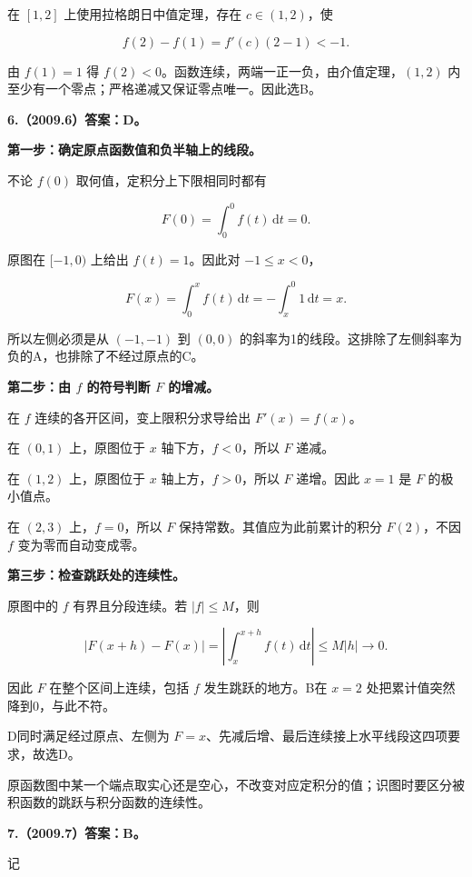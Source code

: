 \documentclass[UTF8,11pt,fontset=windows]{ctexart}
\begin{document}
在 $[1,2]$ 上使用拉格朗日中值定理，存在 $c\in(1,2)$，使

$$
f(2)-f(1)=f'(c)(2-1)<-1.
$$

由 $f(1)=1$ 得 $f(2)<0$。函数连续，两端一正一负，由介值定理，$(1,2)$ 内至少有一个零点；严格递减又保证零点唯一。因此选B。

\clearpage

\textbf{6.（2009.6）答案：D。}

\textbf{第一步：确定原点函数值和负半轴上的线段。}

不论 $f(0)$ 取何值，定积分上下限相同时都有

$$
F(0)=\int_0^0 f(t)\,\mathrm dt=0.
$$

原图在 $[-1,0)$ 上给出 $f(t)=1$。因此对 $-1\le x<0$，

$$
F(x)=\int_0^x f(t)\,\mathrm dt
=-\int_x^0 1\,\mathrm dt=x.
$$

所以左侧必须是从 $(-1,-1)$ 到 $(0,0)$ 的斜率为1的线段。这排除了左侧斜率为负的A，也排除了不经过原点的C。

\textbf{第二步：由 $f$ 的符号判断 $F$ 的增减。}

在 $f$ 连续的各开区间，变上限积分求导给出 $F'(x)=f(x)$。

在 $(0,1)$ 上，原图位于 $x$ 轴下方，$f<0$，所以 $F$ 递减。

在 $(1,2)$ 上，原图位于 $x$ 轴上方，$f>0$，所以 $F$ 递增。因此 $x=1$ 是 $F$ 的极小值点。

在 $(2,3)$ 上，$f=0$，所以 $F$ 保持常数。其值应为此前累计的积分 $F(2)$，不因 $f$ 变为零而自动变成零。

\textbf{第三步：检查跳跃处的连续性。}

原图中的 $f$ 有界且分段连续。若 $|f|\le M$，则

$$
|F(x+h)-F(x)|
=\left|\int_x^{x+h}f(t)\,\mathrm dt\right|
\le M|h|\longrightarrow0.
$$

因此 $F$ 在整个区间上连续，包括 $f$ 发生跳跃的地方。B在 $x=2$ 处把累计值突然降到0，与此不符。

D同时满足经过原点、左侧为 $F=x$、先减后增、最后连续接上水平线段这四项要求，故选D。

原函数图中某一个端点取实心还是空心，不改变对应定积分的值；识图时要区分被积函数的跳跃与积分函数的连续性。

\clearpage

\textbf{7.（2009.7）答案：B。}

记
\end{document}
